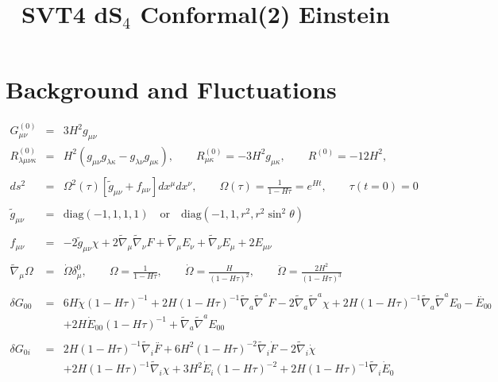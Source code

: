 \documentclass[10pt,letterpaper]{article}
\title{SVT4 dS${}_4$ Conformal(2) Einstein}
\date{}
\numberwithin{equation}{section}
\begin{document}
 
\maketitle
\noindent 
\section{Background and Fluctuations}
\begin{eqnarray}
G^{(0)}_{\mu\nu} &=& 3H^{2} g_{\mu\nu}
\\
R^{(0)}_{\lambda\mu\nu\kappa} &=& H^{2} (g_{\mu\nu}g_{\lambda\kappa}-g_{\lambda\nu}g_{\mu\kappa}),
\qquad
R^{(0)}_{\mu\kappa} = -3 H^{2} g_{\mu\kappa},
\qquad
R^{(0)}= -12 H^{2},
\\ \nonumber\\
ds^2 &=& \Omega^2(\tau)[\tilde g_{\mu\nu}+ f_{\mu\nu}] dx^\mu dx^\nu,\qquad
\Omega(\tau) = \frac{1}{1-H\tau} = e^{Ht},\qquad \tau(t=0) = 0
\label{geom}
\\ \nonumber\\
\tilde g_{\mu\nu} &=& \text{diag}(-1,1,1,1)\quad\text{or}\quad \text{diag}(-1,1,r^2,r^2\sin^2\theta)
\\ \nonumber\\
f_{\mu\nu} &=& -2\tilde g_{\mu\nu} \chi + 2\tilde\nabla_\mu\tilde\nabla_\nu F + \tilde\nabla_\mu E_\nu + \tilde\nabla_\nu E_\mu + 2E_{\mu\nu}
\label{svt}
\\ \nonumber\\
\tilde\nabla_\mu \Omega &=&  \dot\Omega \delta^0_\mu ,\qquad \Omega = \frac{1}{1-H\tau},
\qquad \dot \Omega = \frac{H}{(1-H\tau)^2},\qquad \ddot\Omega = \frac{2H^2}{(1-H\tau)^3}
\\ \nonumber\\
\delta G_{00}&=& 6 H \dot{\chi} (1 -  H \tau)^{-1} + 2 H (1 -  H \tau)^{-1} \tilde{\nabla}_{a}\tilde{\nabla}^{a}\dot{F} - 2 \tilde{\nabla}_{a}\tilde{\nabla}^{a}\chi +2 H (1 -  H \tau)^{-1} \tilde{\nabla}_{a}\tilde{\nabla}^{a}E_{0}{}- \overset{..}{E}_{00}{} \nonumber \\ 
&& + 2 H \dot{E}_{00}{} (1 -  H \tau)^{-1} + \tilde{\nabla}_{a}\tilde{\nabla}^{a}E_{00}{}
\\  \nonumber\\ 
\delta G_{0i}&=& 2 H (1 -  H \tau)^{-1} \tilde{\nabla}_{i}\overset{..}{F} + 6 H^2 (1 -  H \tau)^{-2} \tilde{\nabla}_{i}\dot{F} - 2 \tilde{\nabla}_{i}\dot{\chi} \nonumber \\ 
&& + 2 H (1 -  H \tau)^{-1} \tilde{\nabla}_{i}\chi +3 H^2 \dot{E}_{i} (1 -  H \tau)^{-2} + 2 H (1 -  H \tau)^{-1} \tilde{\nabla}_{i}\dot{E}_{0}{} \nonumber \\ 

\end{eqnarray}
\end{document}
